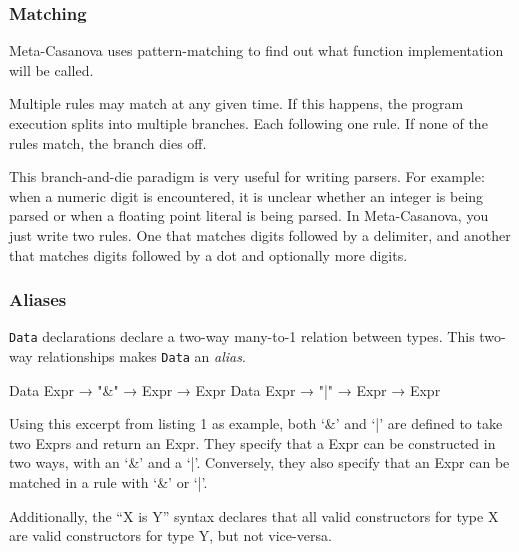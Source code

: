   \subsubsection*{Matching}
  Meta-Casanova uses pattern-matching to find out what function implementation will be called.

  Multiple rules may match at any given time.
  If this happens, the program execution splits into multiple branches.
  Each following one rule.
  If none of the rules match, the branch dies off. 
  
  This branch-and-die paradigm is very useful for writing parsers\cite{huttonmeijer96}.
  For example: when a numeric digit is encountered,
  it is unclear whether an integer is being parsed or when a floating point literal is being parsed. 
  In Meta-Casanova, you just write two rules.
  One that matches digits followed by a delimiter,
  and another that matches digits followed by a dot and optionally more digits.

  \subsubsection*{Aliases}
  \texttt{Data} declarations declare a two-way \mbox{many-to-1} relation between types.
  This two-way relationships makes \texttt{Data} an \textit{alias}.

  \begin{code}
  Data Expr → "&" → Expr → Expr
  Data Expr → "|" → Expr → Expr
  \end{code}

  Using this excerpt from listing 1 as example, both `\&' and `|' are defined to take two Exprs and return an Expr.
  They specify that a Expr can be constructed in two ways, with an `\&' and a `|'.
  Conversely, they also specify that an Expr can be matched in a rule with `\&' or `|'. 

  Additionally, the ``X is Y'' syntax declares that all valid constructors for type X are valid constructors for type Y, but not vice-versa.

